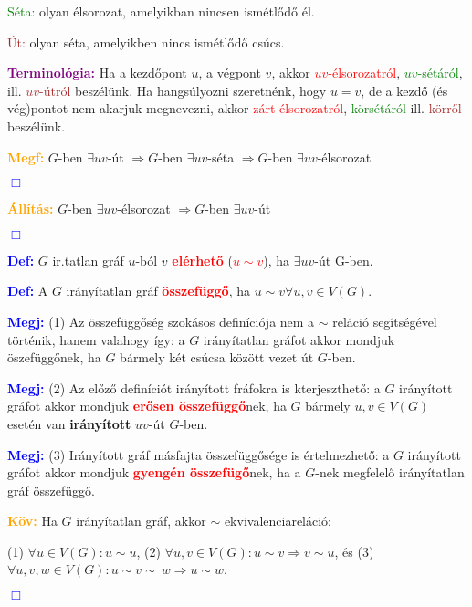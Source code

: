 \documentclass[12pt]{article}
\begin{document}
			\textcolor{green}{Séta:} olyan élsorozat, amelyikban nincsen ismétlődő él.

			\textcolor{brown}{Út:} olyan séta, amelyikben nincs ismétlődő csúcs.

			\textcolor{purple}{\textbf{Terminológia:}} Ha a kezdőpont $u$, a végpont $v$, akkor \textcolor{red}{$uv$-élsorozatról}, \textcolor{green}{$uv$-sétáról}, ill. \textcolor{brown}{$uv$-útról} beszélünk. Ha hangsúlyozni szeretnénk, hogy $u = v$, de a kezdő (és vég)pontot nem akarjuk megnevezni, akkor \textcolor{red}{zárt élsorozatról}, \textcolor{green}{körsétáról} ill. \textcolor{brown}{körről} beszélünk.

			\textcolor{orange}{\textbf{Megf:}} $G$-ben $\exists uv$-út $\Rightarrow G$-ben $\exists uv$-séta $\Rightarrow G$-ben $\exists uv$-élsorozat \raggedright \textcolor{blue}{$\Box$} 

			\textcolor{orange}{\textbf{Állítás:}} $G$-ben $\exists uv$-élsorozat $\Rightarrow G$-ben $\exists uv$-út \raggedright \textcolor{blue}{$\Box$} 

			\textcolor{blue}{\textbf{Def:}} $G$ ir.tatlan gráf $u$-ból $v$ \textcolor{red}{\textbf{elérhető}} (\textcolor{red}{\textbf{$u \sim v$}}), ha $\exists uv$-út G-ben.

			\textcolor{blue}{\textbf{Def:}} A $G$ irányítatlan gráf \textcolor{red}{\textbf{összefüggő}}, ha $u \sim v \forall u,v \in V(G)$.

			\textcolor{blue}{\textbf{Megj:}} (1) Az összefüggőség szokásos definíciója nem a $\sim$ reláció segítségével történik, hanem valahogy így: a $G$ irányítatlan gráfot akkor mondjuk öszefüggőnek, ha $G$ bármely két csúcsa között vezet út $G$-ben.

			\textcolor{blue}{\textbf{Megj:}} (2) Az előző definíciót irányított fráfokra is kterjeszthető: a $G$ irányított gráfot akkor mondjuk \textcolor{red}{\textbf{erősen összefüggő}}nek, ha $G$ bármely $u,v \in V(G) $ esetén van \textbf{irányított} $uv$-út $G$-ben.

			\textcolor{blue}{\textbf{Megj:}} (3) Irányított gráf másfajta összefüggősége is értelmezhető: a $G$ irányított gráfot akkor mondjuk \textcolor{red}{\textbf{gyengén összefügő}}nek, ha a $G$-nek megfelelő irányítatlan gráf összefüggő.

			\textcolor{orange}{\textbf{Köv:}} Ha $G$ irányítatlan gráf, akkor $\sim$ ekvivalenciareláció:

			(1) $\forall u \in V(G) : u \sim u$, (2) $ \forall u,v \in V(G) : u \sim v \Rightarrow v \sim u$, és (3) $\forall u,v,w \in V(G): u \sim v \sim \ w \Rightarrow u \sim w$. \raggedright \textcolor{blue}{$\Box$} 
\end{document}
